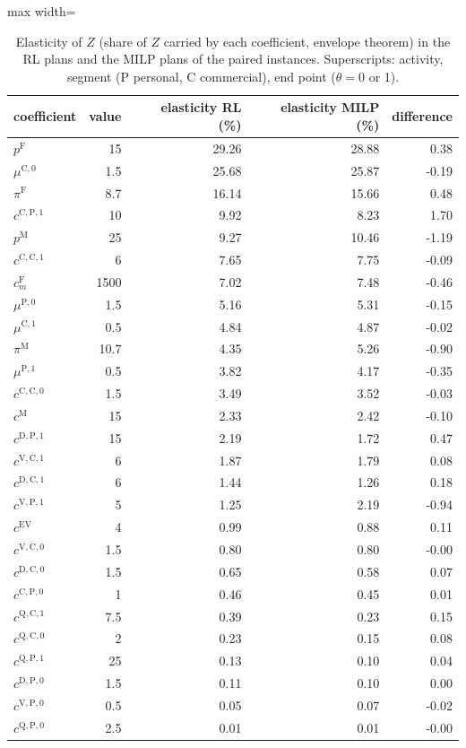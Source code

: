 \begin{table}[H]\centering
\small
\caption{Elasticity of $Z$ (share of $Z$ carried by each coefficient, envelope theorem) in the RL plans and the MILP plans of the paired instances. Superscripts: activity, segment (P personal, C commercial), end point ($\theta=0$ or 1).}\label{tab:elasticity}
\begin{adjustbox}{max width=\textwidth}\begin{tabular}{lrrrr}\toprule
coefficient & value & elasticity RL (\%) & elasticity MILP (\%) & difference \\ \midrule
$p^{\mathrm F}$ & 15 & 29.26 & 28.88 & 0.38 \\
$\mu^{\mathrm{C,0}}$ & 1.5 & 25.68 & 25.87 & -0.19 \\
$\pi^{\mathrm F}$ & 8.7 & 16.14 & 15.66 & 0.48 \\
$c^{\mathrm{C,P,1}}$ & 10 & 9.92 & 8.23 & 1.70 \\
$p^{\mathrm M}$ & 25 & 9.27 & 10.46 & -1.19 \\
$c^{\mathrm{C,C,1}}$ & 6 & 7.65 & 7.75 & -0.09 \\
$c^{\mathrm F}_m$ & 1500 & 7.02 & 7.48 & -0.46 \\
$\mu^{\mathrm{P,0}}$ & 1.5 & 5.16 & 5.31 & -0.15 \\
$\mu^{\mathrm{C,1}}$ & 0.5 & 4.84 & 4.87 & -0.02 \\
$\pi^{\mathrm M}$ & 10.7 & 4.35 & 5.26 & -0.90 \\
$\mu^{\mathrm{P,1}}$ & 0.5 & 3.82 & 4.17 & -0.35 \\
$c^{\mathrm{C,C,0}}$ & 1.5 & 3.49 & 3.52 & -0.03 \\
$c^{\mathrm M}$ & 15 & 2.33 & 2.42 & -0.10 \\
$c^{\mathrm{D,P,1}}$ & 15 & 2.19 & 1.72 & 0.47 \\
$c^{\mathrm{V,C,1}}$ & 6 & 1.87 & 1.79 & 0.08 \\
$c^{\mathrm{D,C,1}}$ & 6 & 1.44 & 1.26 & 0.18 \\
$c^{\mathrm{V,P,1}}$ & 5 & 1.25 & 2.19 & -0.94 \\
$c^{\mathrm{EV}}$ & 4 & 0.99 & 0.88 & 0.11 \\
$c^{\mathrm{V,C,0}}$ & 1.5 & 0.80 & 0.80 & -0.00 \\
$c^{\mathrm{D,C,0}}$ & 1.5 & 0.65 & 0.58 & 0.07 \\
$c^{\mathrm{C,P,0}}$ & 1 & 0.46 & 0.45 & 0.01 \\
$c^{\mathrm{Q,C,1}}$ & 7.5 & 0.39 & 0.23 & 0.15 \\
$c^{\mathrm{Q,C,0}}$ & 2 & 0.23 & 0.15 & 0.08 \\
$c^{\mathrm{Q,P,1}}$ & 25 & 0.13 & 0.10 & 0.04 \\
$c^{\mathrm{D,P,0}}$ & 1.5 & 0.11 & 0.10 & 0.00 \\
$c^{\mathrm{V,P,0}}$ & 0.5 & 0.05 & 0.07 & -0.02 \\
$c^{\mathrm{Q,P,0}}$ & 2.5 & 0.01 & 0.01 & -0.00 \\
\bottomrule\end{tabular}\end{adjustbox}\end{table}
